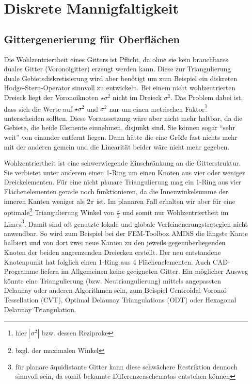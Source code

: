 \renewcommand{\d}{\mathrm{d}}

\chapter{Diskrete Mannigfaltigkeit}

\section{Gittergenerierung für Oberflächen}


  \begin{ziel}
    Die Wohlzentriertheit eines Gitters ist Pflicht, da ohne sie kein brauchbares duales Gitter (Voronoigitter) erzeugt werden kann. 
    Diese zur Triangulierung duale Gebietsdiskretisierung wird aber benötigt um zum Beispiel ein diskreten Hodge-Stern-Operator sinnvoll zu entwickeln. 
    Bei einem nicht wohlzentrierten Dreieck liegt der Voronoiknoten \( \star\sigma^{2} \) nicht im Dreieck \( \sigma^{2} \).
    Das Problem dabei ist, dass sich die Werte auf \( \star\sigma^{2} \) und \( \sigma^{2} \) nur um einen 
    metrischen Faktor\footnote{hier \( |\sigma^{2}| \) bzw. dessen Reziproke} unterscheiden sollten.
    Diese Voraussetzung wäre aber nicht mehr haltbar, da die Gebiete, die beide Elemente einnehmen, disjunkt sind. 
    Sie können sogar  "`sehr weit"'
    von einander entfernt liegen.
    Dann hätte die eine Größe fast nichts mehr mit der anderen gemein und die Linearität beider wäre nicht mehr gegeben.

    Wohlzentriertheit ist eine schwerwiegende Einschränkung an die Gitterstruktur. Sie verbietet unter anderem einen 1-Ring um einen Knoten aus vier oder weniger Dreickelementen.
    Für eine nicht planare Triangulierung mag ein 1-Ring aus vier Flächenelementen gerade noch funktionieren, da die Innenwinkelsumme der inneren Kanten weniger als \( 2\pi \) ist.
    Im planaren Fall erhalten wir aber für eine optimale\footnote{bzgl. der maximalen Winkel} Triangulierung Winkel von \( \frac{\pi}{2} \) 
    und somit nur Wohlzentriertheit im Limes\footnote{für planare äquidistante Gitter kann diese schwächere Restriktion dennoch sinnvoll sein, da somit bekannte Differenzenschematas entstehen können}.
    Damit sind oft genutzte lokale und globale Verfeinenerungstrategien nicht anwendbar. So wird zum Beispiel bei der FEM-Toolbox AMDiS \cite{amdis} die längste Kante halbiert und von dort zwei neue Kanten zu den jeweils gegenüberliegenden Knoten der beiden angrenzenden Dreiecken erstellt. Der neu entstandene Knotenpunkt hat folglich einen 1-Ring aus 4 Flächenelementen.
    Auch CAD-Programme liefern im Allgemeinen keine geeigneten Gitter. 
    Ein möglicher Ausweg könnte eine Triangulierung (bzw. Neutriangulierung) mittels angepassten Delaunay oder anderen Algorithmen sein, zum Beispiel Centroidal Voronoi Tessellation (CVT)\cite{CVTGunzburger}, 
    Optimal Delaunay Triangulations (ODT)\cite{ODT} oder Hexagonal Delaunay Triangulation\cite{HDT}.


\end{ziel}
